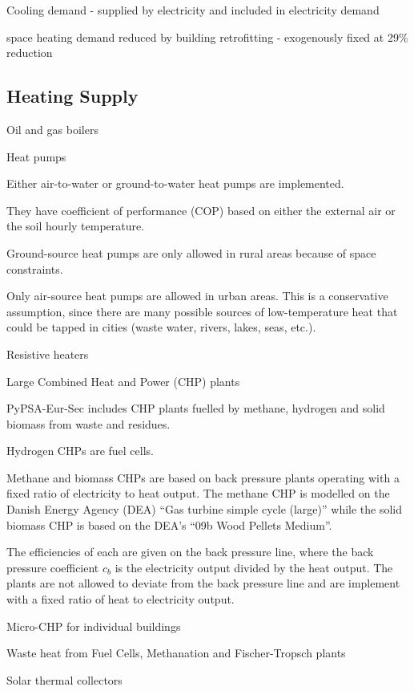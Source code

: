 Cooling demand
- supplied by electricity and included in electricity demand

space heating demand reduced by building retrofitting
- exogenously fixed at 29\% reduction

\subsection{Heating Supply}

Oil and gas boilers

Heat pumps

Either air-to-water or ground-to-water heat pumps are implemented.

They have coefficient of performance (COP) based on either the external air or the soil hourly temperature.

Ground-source heat pumps are only allowed in rural areas because of space constraints.

Only air-source heat pumps are allowed in urban areas. This is a conservative
assumption, since there are many possible sources of low-temperature heat that
could be tapped in cities (waste water, rivers, lakes, seas, etc.).

Resistive heaters

Large Combined Heat and Power (CHP) plants


PyPSA-Eur-Sec includes CHP plants fuelled by methane, hydrogen and solid biomass from waste and residues.

Hydrogen CHPs are fuel cells.

Methane and biomass CHPs are based on back pressure plants operating with a
fixed ratio of electricity to heat output. The methane CHP is modelled on the
Danish Energy Agency (DEA) “Gas turbine simple cycle (large)” while the solid
biomass CHP is based on the DEA’s “09b Wood Pellets Medium”.

The efficiencies of each are given on the back pressure line, where the back
pressure coefficient $c_b$ is the electricity output divided by the heat output.
The plants are not allowed to deviate from the back pressure line and are
implement with a fixed ratio of heat to electricity output.

Micro-CHP for individual buildings

Waste heat from Fuel Cells, Methanation and Fischer-Tropsch plants

Solar thermal collectors

